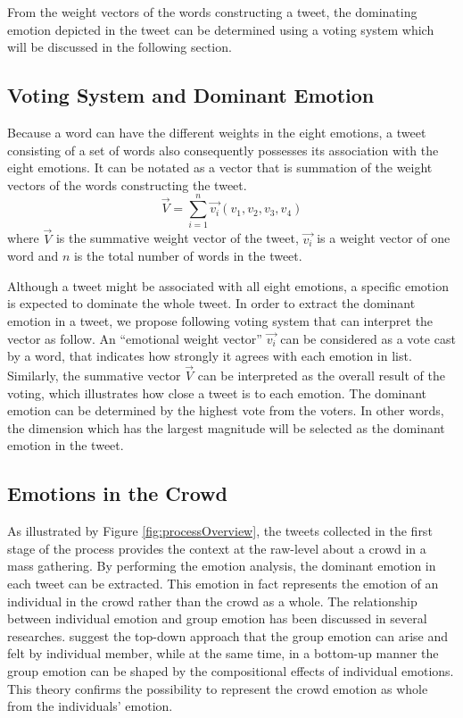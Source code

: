 From the weight vectors of the words constructing a tweet, the dominating emotion depicted in the tweet can be determined using a voting system which will be discussed in the following section.

\subsection{Voting System and Dominant Emotion}
Because a word can have the different weights in the eight emotions, a tweet consisting of a set of words also consequently possesses its association with the eight emotions. It can be notated as a vector that is summation of the weight vectors of the words constructing the tweet.
\[
	\vec{V} = \sum_{i=1}^{n} \vec{v_i}(v_1, v_2, v_3, v_4)
\]
where \(\vec{V}\) is the summative weight vector of the tweet, \(\vec{v_i}\) is a weight vector of one word and \(n\) is the total number of words in the tweet.

Although a tweet might be associated with all eight emotions, a specific emotion is expected to dominate the whole tweet. In order to extract the dominant emotion in a tweet, we propose following voting system that can interpret the vector as follow. An ``emotional weight vector'' \(\vec{v_i}\) can be considered as a vote cast by a word, that indicates how strongly it agrees with each emotion in list. Similarly, the summative vector \(\vec{V}\) can be interpreted as the overall result of the voting, which illustrates how close a tweet is to each emotion. The dominant emotion can be determined by the highest vote from the voters. In other words, the dimension which has the largest magnitude will be selected as the dominant emotion in the tweet.

\subsection{Emotions in the Crowd}
As illustrated by Figure \ref{fig:processOverview}, the tweets collected in the first stage of the process provides the context at the raw-level about a crowd in a mass gathering. By performing the emotion analysis, the dominant emotion in each tweet can be extracted. This emotion in fact represents the emotion of an individual in the crowd rather than the crowd as a whole. The relationship between individual emotion and group emotion has been discussed in several researches. \citet{barsade1998group} suggest the top-down approach that the group emotion can arise and felt by individual member, while at the same time, in a bottom-up manner the group emotion can be shaped by the compositional effects of individual emotions. This theory confirms the possibility to represent the crowd emotion as whole from the individuals' emotion.

